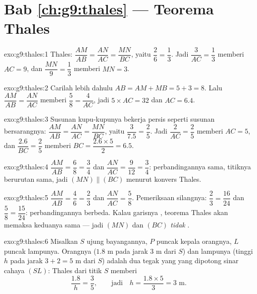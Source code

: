 \section*{Bab \ref{ch:g9:thales} --- Teorema Thales}

\begin{solution}{exo:g9:thales:1}
Thales: $\dfrac{AM}{AB} = \dfrac{AN}{AC} = \dfrac{MN}{BC}$, yaitu
$\dfrac26 = \dfrac13$. Jadi $\dfrac{3}{AC} = \dfrac13$ memberi
$AC = 9$, dan $\dfrac{MN}{9} = \dfrac13$ memberi $MN = 3$.
\end{solution}

\begin{solution}{exo:g9:thales:2}
Carilah lebih dahulu $AB = AM + MB = 5 + 3 = 8$. Lalu
$\dfrac{AM}{AB} = \dfrac{AN}{AC}$ memberi $\dfrac58 = \dfrac{4}{AC}$,
jadi $5 \times AC = 32$ dan $AC = 6.4$.
\end{solution}

\begin{solution}{exo:g9:thales:3}
Susunan kupu-kupunya bekerja persis seperti susunan bersarangnya:
$\dfrac{AM}{AB} = \dfrac{AN}{AC} = \dfrac{MN}{BC}$, yaitu
$\dfrac{3}{7.5} = \dfrac25$. Jadi $\dfrac{2}{AC} = \dfrac25$ memberi
$AC = 5$, dan $\dfrac{2.6}{BC} = \dfrac25$ memberi
$BC = \dfrac{2.6 \times 5}{2} = 6.5$.
\end{solution}

\begin{solution}{exo:g9:thales:4}
$\dfrac{AM}{AB} = \dfrac68 = \dfrac34$ dan
$\dfrac{AN}{AC} = \dfrac{9}{12} = \dfrac34$: perbandingannya sama,
titiknya berurutan sama, jadi $(MN) \parallel (BC)$ menurut konvers Thales.
\end{solution}

\begin{solution}{exo:g9:thales:5}
$\dfrac{AM}{AB} = \dfrac46 = \dfrac23$ dan
$\dfrac{AN}{AC} = \dfrac58$. Pemeriksaan silangnya:
$\dfrac23 = \dfrac{16}{24}$ dan $\dfrac58 = \dfrac{15}{24}$:
perbandingannya berbeda. Kalau garisnya , teorema Thales akan
memaksa keduanya sama --- jadi $(MN)$ dan $(BC)$ \emph{tidak} .
\end{solution}

\begin{solution}{exo:g9:thales:6}
Misalkan $S$ ujung bayangannya, $P$ puncak kepala orangnya, $L$
puncak lampunya. Orangnya ($1.8$ m pada jarak $3$ m dari $S$) dan
lampunya (tinggi $h$ pada jarak $3 + 2 = 5$ m dari $S$) adalah dua
 tegak yang  yang dipotong sinar cahaya $(SL)$:
Thales dari titik $S$ memberi
\[
\frac{1.8}{h} = \frac{3}{5},
\qquad\text{jadi}\quad
h = \frac{1.8 \times 5}{3} = 3 \text{ m}.
\]
\end{solution}

